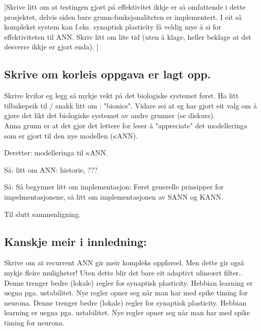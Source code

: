 [Skrive litt om at testingen gjort på effektivitet ikkje er så omfattende i dette prosjektet, delvis siden bare grunn-funksjonaliteten er implementert.
I eit så komplekst system kan f.eks. synaptisk plasticity få veldig mye å si for effektiviteten til ANN. Skriv litt om lite tid (uten å klage, heller beklage at det desverre ikkje er gjort enda).
]

\subsection{Skrive om korleis oppgava er lagt opp.}
Skrive kvifor eg legg så mykje vekt på det biologiske systemet først. Ha litt tilbakepeik til / snakk litt om : "bionics". Vidare sei at eg har gjort eit valg om å gjøre det likt det biologiske systemet av andre grunner (se diskurs).\\
Anna grunn er at det gjør det lettere for leser å "appreciate" det modelleringa som er gjort til den nye modellen ($\kappa$ANN).

Deretter: modelleringa til $\kappa$ANN.

Så: litt om ANN: historie, ???

Så: Så begynner litt om implementasjon: Først generelle prinsipper for impelmentasjonene, så litt om implementasjonen av SANN og KANN.

Til slutt sammenligning.


\subsection{Kanskje meir i innledning:}

Skrive om at recurrent ANN gir meir kompleks oppførsel. Men dette gir også mykje fleire muligheter! Uten dette blir det bare eit adaptivt ulineært filter..
Denne trenger bedre (lokale) regler for synaptisk plasticity. Hebbian learning er uegna pga. ustabilitet. Nye regler opner seg når man har med spike timing for neurona. 
Denne trenger bedre (lokale) regler for synaptisk plasticity. Hebbian learning er uegna pga. ustabilitet. Nye regler opner seg når man har med spike timing for neurona. 

